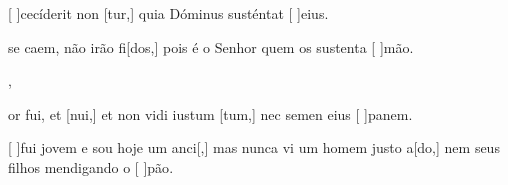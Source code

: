 {  {\item {}[ ]{ce}cíderit non [tur,] quia Dóminus susténtat [ ]{e}ius.~\Antiphona}%
    {\item {} se caem, não irão fi[dos,] pois é o Senhor quem os sustenta [ ]{mão}.~\Antiphona},
  {\item {}or fui, et [nui,] et non vidi iustum [\-tum,] nec semen eius [ ]{pa}nem.~\Antiphona}%
    {\item {}[ ]{fui} jovem e sou hoje um anci[,] mas nunca vi um homem justo a[\-do,] nem seus filhos mendigando o [ ]{pão}.~\Antiphona}
}